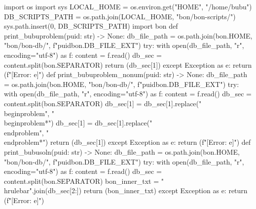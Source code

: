 \begin{pycode}
import os
import sys
LOCAL_HOME = os.environ.get("HOME", "/home/bubu")
DB_SCRIPTS_PATH = os.path.join(LOCAL_HOME, "bon/bon-scripts/")
sys.path.insert(0, DB_SCRIPTS_PATH)
import bon
def print_bubuproblem(puid: str) -> None:
    db_file_path = os.path.join(bon.HOME, "bon/bon-db/", f"{puid}{bon.DB_FILE_EXT}")
    try:
        with open(db_file_path, "r", encoding="utf-8") as f:
            content = f.read()
        db_sec = content.split(bon.SEPARATOR)
        return (db_sec[1])
    except Exception as e:
        return (f"[Error: {e}]")
def print_bubuproblem_nonum(puid: str) -> None:
    db_file_path = os.path.join(bon.HOME, "bon/bon-db/", f"{puid}{bon.DB_FILE_EXT}")
    try:
        with open(db_file_path, "r", encoding="utf-8") as f:
            content = f.read()
        db_sec = content.split(bon.SEPARATOR)
        db_sec[1] = db_sec[1].replace("\\begin{problem}", "\\begin{problem*}")
        db_sec[1] = db_sec[1].replace("\\end{problem}", "\\end{problem*}")
        return (db_sec[1])
    except Exception as e:
        return (f"[Error: {e}]")
def print_bubusoln(puid: str) -> None:
    db_file_path = os.path.join(bon.HOME, "bon/bon-db/", f"{puid}{bon.DB_FILE_EXT}")
    try:
        with open(db_file_path, "r", encoding="utf-8") as f:
            content = f.read()
        db_sec = content.split(bon.SEPARATOR)
        bon_inner_txt = "\n\\hrulebar\n".join(db_sec[2:])
        return (bon_inner_txt)
    except Exception as e:
        return (f"[Error: {e}]")
\end{pycode}

